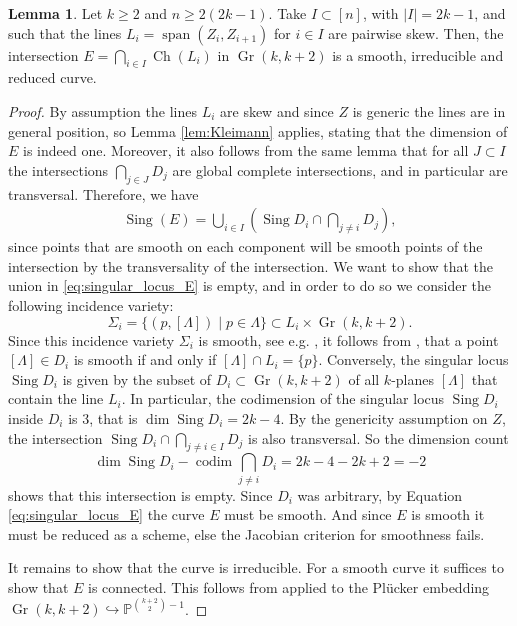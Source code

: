 \documentclass[12pt]{extarticle}
\theoremstyle{definition}
\theoremstyle{theorem}
\newtheorem{lemma}[definition]{Lemma}
\theoremstyle{remark}
\numberwithin{equation}{section}
\newcommand{\PP}{\mathbb{P}}
\DeclareMathOperator{\gr}{Gr}
\newcommand{\grk}{\operatorname{Gr}(k,k+2)}
\newcommand{\CH}{\operatorname{Ch}}
\newcommand{\sing}{\operatorname{Sing}}
\newcommand{\codim}{\operatorname{codim}}
\begin{document}
\begin{lemma}\label{lem:curve_smooth_irreducible}
    Let $k\geq 2$ and $n\geq 2(2k-1)$. Take $I\subset [n]$, with $|I|=2k-1$, and such that the lines $L_i = \operatorname{span}(Z_i,Z_{i+1})$ for $i\in I$ are pairwise skew.
    Then, the intersection $E=\bigcap _{i\in I}\CH(L_i)$ in $\grk$ is a smooth, irreducible and reduced curve.
\end{lemma}
\begin{proof}
    By assumption the lines $L_i$ are skew and since $Z$ is generic the lines are in general position, so Lemma \ref{lem:Kleimann} applies, stating that the dimension of $E$ is indeed one.
    Moreover, it also follows from the same lemma that for all $J\subset I$ the intersections $\bigcap_{j\in J}D_j$ are global complete intersections, and in particular are transversal.
    Therefore, we have 
    \begin{align}\label{eq:singular_locus_E}
        \sing (E)=\bigcup_{i\in I}\left(\sing D_i\cap \bigcap_{j\neq i}D_j\right),
    \end{align}
    since points that are smooth on each component will be smooth points of the intersection by the transversality of the intersection.
    We want to show that the union in \eqref{eq:singular_locus_E} is empty, and in order to do so we consider the following incidence variety:
    \[
    \Sigma_i=\{ (p,[\Lambda])\mid p\in \Lambda  \}\subset L_i\times \grk.
    \] 
    Since this incidence variety $\Sigma_i$ is smooth, see e.g. \cite[Proposition 3.4]{koefler2025takingamplituhedronlimit}, it follows from \cite[Corollary 14.10]{Harris_AG}, that a point $[\Lambda] \in D_i$ is smooth if and only if $[\Lambda] \cap L_i=\{p\}$.
    Conversely, the singular locus $\sing D_i$ is given  by the subset of $D_i\subset \gr(k,k+2)$ of all $k$-planes $[\Lambda]$ that contain the line $L_i$.
    In particular, the codimension of the singular locus $\sing D_i$ inside $D_i$ is $3$, that is $\dim \sing D_i=2k-4$.
    By the genericity assumption on $Z$, the intersection $\sing D_i\cap \bigcap_{j\neq i\in I}D_j$ is also transversal.
    So the dimension count 
    \[
    \dim\sing D_i-\codim \bigcap_{j\neq i}D_i=2k-4-2k+2=-2
    \]
    shows that this intersection is empty.
    Since $D_i$ was arbitrary, by Equation \eqref{eq:singular_locus_E} the curve $E$ must be smooth. And since $E$ is smooth it must be reduced as a scheme, else the Jacobian criterion for smoothness fails.
    
    It remains to show that the curve is irreducible. For a smooth curve it suffices to show that $E$ is connected.
    This follows from \cite[Theorem 1.1]{martinelli2017connectedness} applied to the Pl\"ucker embedding $\grk\hookrightarrow\PP^{\binom{k+2}{2}-1}$.
\end{proof}
\end{document}

